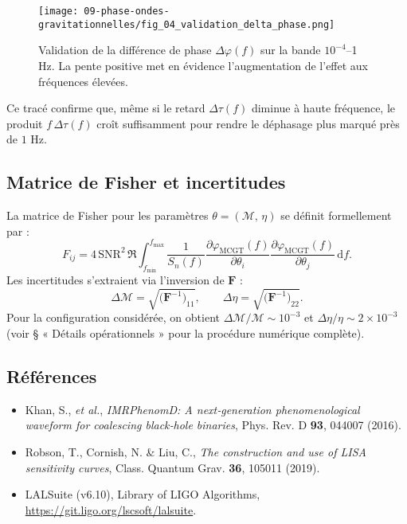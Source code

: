 \begin{figure}[htbp]
  \centering
  \texttt{[image: 09-phase-ondes-gravitationnelles/fig\_04\_validation\_delta\_phase.png]}
  \caption{Validation de la différence de phase \(\Delta\varphi(f)\) sur la bande \(10^{-4}\)–1 Hz. La pente positive met en évidence l’augmentation de l’effet aux fréquences élevées.}
  \label{fig:validation_delta_phase_full}
\end{figure}

Ce tracé confirme que, même si le retard \(\Delta\tau(f)\) diminue à haute fréquence, le produit \(f\,\Delta\tau(f)\) croît suffisamment pour rendre le déphasage plus marqué près de \(1\) Hz.

\subsection{Matrice de Fisher et incertitudes}
La matrice de Fisher pour les paramètres
\(\theta = (\mathcal{M},\,\eta)\) se définit formellement par :
\[
  F_{ij}
  = 4\,\mathrm{SNR}^{2}\,
    \Re\!\int_{f_{\min}}^{f_{\max}}
      \frac{1}{S_{n}(f)}
      \frac{\partial\varphi_{\mathrm{MCGT}}(f)}{\partial \theta_{i}}
      \frac{\partial\varphi_{\mathrm{MCGT}}(f)}{\partial \theta_{j}}
    \,\mathrm{d}f.
\]
Les incertitudes s’extraient via l’inversion de \(\mathbf{F}\) :
\[
  \Delta\mathcal{M}
  = \sqrt{\bigl(\mathbf{F}^{-1}\bigr)_{11}},
  \qquad
  \Delta\eta
  = \sqrt{\bigl(\mathbf{F}^{-1}\bigr)_{22}}.
\]
Pour la configuration considérée, on obtient
\(\Delta\mathcal{M}/\mathcal{M}\sim10^{-3}\) et
\(\Delta\eta/\eta\sim2\times10^{-3}\)
(voir § « Détails opérationnels » pour la procédure numérique complète).

\subsection{Références}
\begin{itemize}
  \item Khan, S., \emph{et al.}, \emph{IMRPhenomD: A next‐generation phenomenological waveform for coalescing black‐hole binaries}, Phys. Rev. D \textbf{93}, 044007 (2016).
  \item Robson, T., Cornish, N. \& Liu, C., \emph{The construction and use of LISA sensitivity curves}, Class. Quantum Grav. \textbf{36}, 105011 (2019).
  \item LALSuite (v6.10), Library of LIGO Algorithms, \url{https://git.ligo.org/lscsoft/lalsuite}.
\end{itemize}

